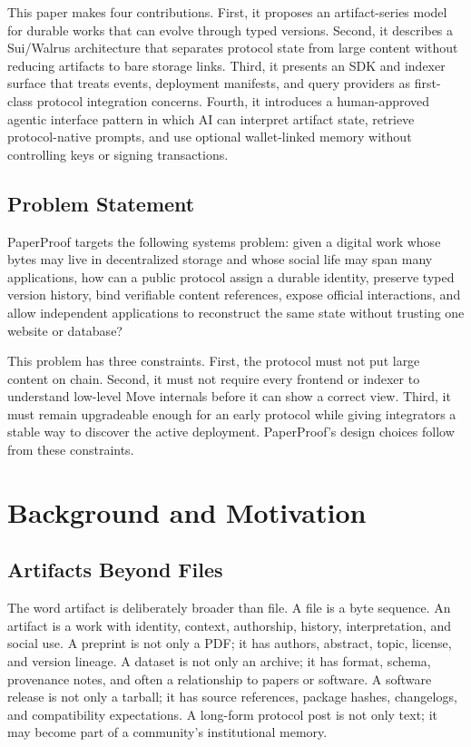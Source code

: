 \documentclass[journal]{IEEEtran}
\begin{document}
This paper makes four contributions. First, it proposes an artifact-series model for durable works that can evolve through typed versions. Second, it describes a Sui/Walrus architecture that separates protocol state from large content without reducing artifacts to bare storage links. Third, it presents an SDK and indexer surface that treats events, deployment manifests, and query providers as first-class protocol integration concerns. Fourth, it introduces a human-approved agentic interface pattern in which AI can interpret artifact state, retrieve protocol-native prompts, and use optional wallet-linked memory without controlling keys or signing transactions.

\subsection{Problem Statement}

PaperProof targets the following systems problem: given a digital work whose bytes may live in decentralized storage and whose social life may span many applications, how can a public protocol assign a durable identity, preserve typed version history, bind verifiable content references, expose official interactions, and allow independent applications to reconstruct the same state without trusting one website or database?

This problem has three constraints. First, the protocol must not put large content on chain. Second, it must not require every frontend or indexer to understand low-level Move internals before it can show a correct view. Third, it must remain upgradeable enough for an early protocol while giving integrators a stable way to discover the active deployment. PaperProof's design choices follow from these constraints.

\section{Background and Motivation}

\subsection{Artifacts Beyond Files}

The word artifact is deliberately broader than file. A file is a byte sequence. An artifact is a work with identity, context, authorship, history, interpretation, and social use. A preprint is not only a PDF; it has authors, abstract, topic, license, and version lineage. A dataset is not only an archive; it has format, schema, provenance notes, and often a relationship to papers or software. A software release is not only a tarball; it has source references, package hashes, changelogs, and compatibility expectations. A long-form protocol post is not only text; it may become part of a community's institutional memory.
\end{document}
